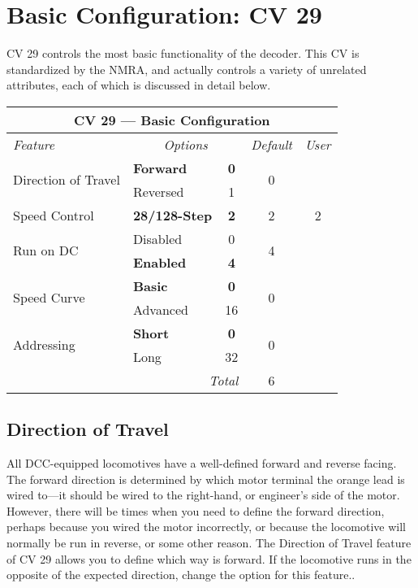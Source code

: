 \documentclass[12pt,letterpaper,draft]{memoir} %
\begin{document}
\section{Basic Configuration: CV 29}

CV 29 controls the most basic functionality of the decoder. This CV is standardized by the NMRA, and actually controls a variety of unrelated attributes, each of which is discussed in detail below.

\label{CV29}
\begin{center}
\begin{tabular}{|l|lc|c|c|}
\hline
\multicolumn{5}{|c|}{\textbf{CV 29 --- Basic Configuration}} \\ \hline \hline
\textit{Feature} & \multicolumn{2}{c|}{\textit{Options}} & \textit{Default} & \textit{User} \\ \hline
\multirow{2}{*}{Direction of Travel} & \textbf{Forward}	 & \textbf{0} & \multirow{2}{*}{0} &\\
& Reversed & 1 & & \\ \hline
Speed Control & \textbf{28/128-Step} & \textbf{2} & 2 & 2\\ \hline
\multirow{2}{*}{Run on DC} & Disabled & 0 & \multirow{2}{*}{4} & \\
& \textbf{Enabled} & \textbf{4} & & \\ \hline
\multirow{2}{*}{Speed Curve} & \textbf{Basic} & \textbf{0}  & \multirow{2}{*}{0}& \\
& Advanced & 16 & &\\ \hline
\multirow{2}{*}{Addressing} & \textbf{Short} & \textbf{0} & \multirow{2}{*}{0} & \\
& Long & 32 & &\\ \hline \hline
\multicolumn{3}{|r|}{\textit{Total}} & 6 &\\ \hline
\end{tabular}
\end{center}

\subsection{Direction of Travel}
\label{DC29directionoftravel}
All DCC-equipped locomotives have a well-defined forward and reverse facing. The forward direction is determined by which motor terminal the orange lead is wired to---it should be wired to the right-hand, or engineer's side of the motor. However, there will be times when you need to define the forward direction, perhaps because you wired the motor incorrectly, or because the locomotive will normally be run in reverse, or some other reason. The Direction of Travel feature of CV 29 allows you to define which way is forward. If the locomotive runs in the opposite of the expected direction, change the option for this feature..
\end{document}
